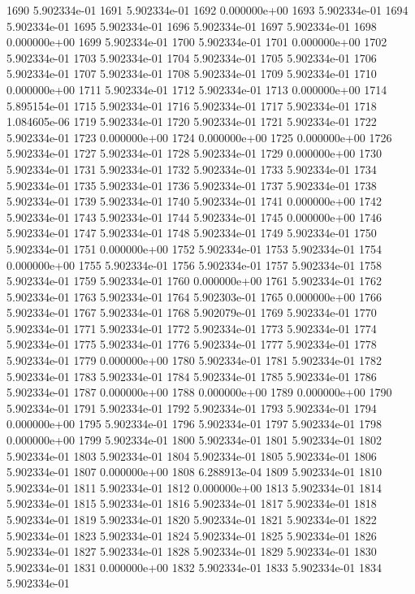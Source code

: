 \documentclass{article}
\begin{document}
\begin{Schunk}
\begin{Soutput}
1690 5.902334e-01
1691 5.902334e-01
1692 0.000000e+00
1693 5.902334e-01
1694 5.902334e-01
1695 5.902334e-01
1696 5.902334e-01
1697 5.902334e-01
1698 0.000000e+00
1699 5.902334e-01
1700 5.902334e-01
1701 0.000000e+00
1702 5.902334e-01
1703 5.902334e-01
1704 5.902334e-01
1705 5.902334e-01
1706 5.902334e-01
1707 5.902334e-01
1708 5.902334e-01
1709 5.902334e-01
1710 0.000000e+00
1711 5.902334e-01
1712 5.902334e-01
1713 0.000000e+00
1714 5.895154e-01
1715 5.902334e-01
1716 5.902334e-01
1717 5.902334e-01
1718 1.084605e-06
1719 5.902334e-01
1720 5.902334e-01
1721 5.902334e-01
1722 5.902334e-01
1723 0.000000e+00
1724 0.000000e+00
1725 0.000000e+00
1726 5.902334e-01
1727 5.902334e-01
1728 5.902334e-01
1729 0.000000e+00
1730 5.902334e-01
1731 5.902334e-01
1732 5.902334e-01
1733 5.902334e-01
1734 5.902334e-01
1735 5.902334e-01
1736 5.902334e-01
1737 5.902334e-01
1738 5.902334e-01
1739 5.902334e-01
1740 5.902334e-01
1741 0.000000e+00
1742 5.902334e-01
1743 5.902334e-01
1744 5.902334e-01
1745 0.000000e+00
1746 5.902334e-01
1747 5.902334e-01
1748 5.902334e-01
1749 5.902334e-01
1750 5.902334e-01
1751 0.000000e+00
1752 5.902334e-01
1753 5.902334e-01
1754 0.000000e+00
1755 5.902334e-01
1756 5.902334e-01
1757 5.902334e-01
1758 5.902334e-01
1759 5.902334e-01
1760 0.000000e+00
1761 5.902334e-01
1762 5.902334e-01
1763 5.902334e-01
1764 5.902303e-01
1765 0.000000e+00
1766 5.902334e-01
1767 5.902334e-01
1768 5.902079e-01
1769 5.902334e-01
1770 5.902334e-01
1771 5.902334e-01
1772 5.902334e-01
1773 5.902334e-01
1774 5.902334e-01
1775 5.902334e-01
1776 5.902334e-01
1777 5.902334e-01
1778 5.902334e-01
1779 0.000000e+00
1780 5.902334e-01
1781 5.902334e-01
1782 5.902334e-01
1783 5.902334e-01
1784 5.902334e-01
1785 5.902334e-01
1786 5.902334e-01
1787 0.000000e+00
1788 0.000000e+00
1789 0.000000e+00
1790 5.902334e-01
1791 5.902334e-01
1792 5.902334e-01
1793 5.902334e-01
1794 0.000000e+00
1795 5.902334e-01
1796 5.902334e-01
1797 5.902334e-01
1798 0.000000e+00
1799 5.902334e-01
1800 5.902334e-01
1801 5.902334e-01
1802 5.902334e-01
1803 5.902334e-01
1804 5.902334e-01
1805 5.902334e-01
1806 5.902334e-01
1807 0.000000e+00
1808 6.288913e-04
1809 5.902334e-01
1810 5.902334e-01
1811 5.902334e-01
1812 0.000000e+00
1813 5.902334e-01
1814 5.902334e-01
1815 5.902334e-01
1816 5.902334e-01
1817 5.902334e-01
1818 5.902334e-01
1819 5.902334e-01
1820 5.902334e-01
1821 5.902334e-01
1822 5.902334e-01
1823 5.902334e-01
1824 5.902334e-01
1825 5.902334e-01
1826 5.902334e-01
1827 5.902334e-01
1828 5.902334e-01
1829 5.902334e-01
1830 5.902334e-01
1831 0.000000e+00
1832 5.902334e-01
1833 5.902334e-01
1834 5.902334e-01

\end{Soutput}
\end{Schunk}
\end{document}
